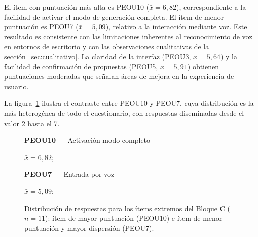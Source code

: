 El ítem con puntuación más alta es PEOU10 ($\bar{x} = 6{,}82$), correspondiente a la facilidad de activar el modo de generación completa. El ítem de menor puntuación es PEOU7 ($\bar{x} = 5{,}09$), relativo a la interacción mediante voz. Este resultado es consistente con las limitaciones inherentes al reconocimiento de voz en entornos de escritorio y con las observaciones cualitativas de la sección~\ref{sec:cualitativo}. La claridad de la interfaz (PEOU3, $\bar{x} = 5{,}64$) y la facilidad de confirmación de propuestas (PEOU5, $\bar{x} = 5{,}91$) obtienen puntuaciones moderadas que señalan áreas de mejora en la experiencia de usuario.

La figura~\ref{fig:barchart-peou} ilustra el contraste entre PEOU10 y PEOU7, cuya distribución es la más heterogénea de todo el cuestionario, con respuestas diseminadas desde el valor 2 hasta el 7.

\begin{figure}[h!]
\centering
\begin{minipage}[t]{0.47\linewidth}
\centering
{}
\par\vspace{4pt}
{\small\textbf{PEOU10} — Activación modo completo\par $\bar{x}=6{,}82$;}
\end{minipage}
\hfill
\begin{minipage}[t]{0.47\linewidth}
\centering
{}
\par\vspace{4pt}
{\small\textbf{PEOU7} — Entrada por voz\par $\bar{x}=5{,}09$;}
\end{minipage}
\caption{Distribución de respuestas para los ítems extremos del Bloque C ($n=11$): ítem de mayor puntuación (PEOU10) e ítem de menor puntuación y mayor dispersión (PEOU7).}
\label{fig:barchart-peou}
\end{figure}

